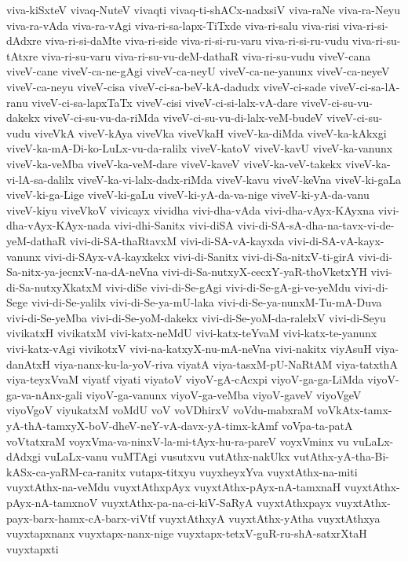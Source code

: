 {viva-kiSxteV
vivaq-NuteV
vivaqti
vivaq-ti-shACx-nadxsiV
viva-raNe
viva-ra-Neyu
viva-ra-vAda
viva-ra-vAgi
viva-ri-sa-lapx-TiTxde
viva-ri-salu
viva-risi
viva-ri-si-dAdxre
viva-ri-si-daMte
viva-ri-side
viva-ri-si-ru-varu
viva-ri-si-ru-vudu
viva-ri-su-tAtxre
viva-ri-su-varu
viva-ri-su-vu-deM-dathaR
viva-ri-su-vudu
viveV-cana
viveV-cane
viveV-ca-ne-gAgi
viveV-ca-neyU
viveV-ca-ne-yanunx
viveV-ca-neyeV
viveV-ca-neyu
viveV-cisa
viveV-ci-sa-beV-kA-dadudx
viveV-ci-sade
viveV-ci-sa-lA-ranu
viveV-ci-sa-lapxTaTx
viveV-cisi
viveV-ci-si-lalx-vA-dare
viveV-ci-su-vu-dakekx
viveV-ci-su-vu-da-riMda
viveV-ci-su-vu-di-lalx-veM-budeV
viveV-ci-su-vudu
viveVkA
viveV-kAya
viveVka
viveVkaH
viveV-ka-diMda
viveV-ka-kAkxgi
viveV-ka-mA-Di-ko-LuLx-vu-da-ralilx
viveV-katoV
viveV-kavU
viveV-ka-vanunx
viveV-ka-veMba
viveV-ka-veM-dare
viveV-kaveV
viveV-ka-veV-takekx
viveV-ka-vi-lA-sa-dalilx
viveV-ka-vi-lalx-dadx-riMda
viveV-kavu
viveV-keVna
viveV-ki-gaLa
viveV-ki-ga-Lige
viveV-ki-gaLu
viveV-ki-yA-da-va-nige
viveV-ki-yA-da-vanu
viveV-kiyu
viveVkoV
vivicayx
vividha
vivi-dha-vAda
vivi-dha-vAyx-KAyxna
vivi-dha-vAyx-KAyx-nada
vivi-dhi-Sanitx
vivi-diSA
vivi-di-SA-sA-dha-na-tavx-vi-de-yeM-dathaR
vivi-di-SA-thaRtavxM
vivi-di-SA-vA-kayxda
vivi-di-SA-vA-kayx-vanunx
vivi-di-SAyx-vA-kayxkekx
vivi-di-Sanitx
vivi-di-Sa-nitxV-ti-girA
vivi-di-Sa-nitx-ya-jecnxV-na-dA-neVna
vivi-di-Sa-nutxyX-cecxY-yaR-thoVketxYH
vivi-di-Sa-nutxyXkatxM
vivi-diSe
vivi-di-Se-gAgi
vivi-di-Se-gA-gi-ve-yeMdu
vivi-di-Sege
vivi-di-Se-yalilx
vivi-di-Se-ya-mU-laka
vivi-di-Se-ya-nunxM-Tu-mA-Duva
vivi-di-Se-yeMba
vivi-di-Se-yoM-dakekx
vivi-di-Se-yoM-da-ralelxV
vivi-di-Seyu
vivikatxH
vivikatxM
vivi-katx-neMdU
vivi-katx-teYvaM
vivi-katx-te-yanunx
vivi-katx-vAgi
vivikotxV
vivi-na-katxyX-nu-mA-neVna
vivi-nakitx
viyAsuH
viya-danAtxH
viya-nanx-ku-la-yoV-riva
viyatA
viya-tasxM-pU-NaRtAM
viya-tatxthA
viya-teyxVvaM
viyatf
viyati
viyatoV
viyoV-gA-cAcxpi
viyoV-ga-ga-LiMda
viyoV-ga-va-nAnx-gali
viyoV-ga-vanunx
viyoV-ga-veMba
viyoV-gaveV
viyoVgeV
viyoVgoV
viyukatxM
voMdU
voV
voVDhirxV
voVdu-mabxraM
voVkAtx-tamx-yA-thA-tamxyX-boV-dheV-neY-vA-davx-yA-timx-kAmf
voVpa-ta-patA
voVtatxraM
voyxVma-va-ninxV-la-mi-tAyx-hu-ra-pareV
voyxVminx
vu
vuLaLx-dAdxgi
vuLaLx-vanu
vuMTAgi
vusutxvu
vutAthx-nakUkx
vutAthx-yA-tha-Bi-kASx-ca-yaRM-ca-ranitx
vutapx-titxyu
vuyxheyxYva
vuyxtAthx-na-miti
vuyxtAthx-na-veMdu
vuyxtAthxpAyx
vuyxtAthx-pAyx-nA-tamxnaH
vuyxtAthx-pAyx-nA-tamxnoV
vuyxtAthx-pa-na-ci-kiV-SaRyA
vuyxtAthxpayx
vuyxtAthx-payx-barx-hamx-cA-barx-viVtf
vuyxtAthxyA
vuyxtAthx-yAtha
vuyxtAthxya
vuyxtapxnanx
vuyxtapx-nanx-nige
vuyxtapx-tetxV-guR-ru-shA-satxrXtaH
vuyxtapxti
}
